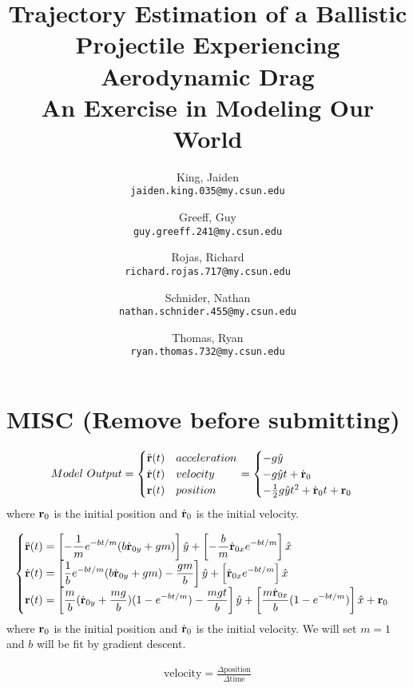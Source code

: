 \documentclass[12pt,english]{article}
\author{
	King, Jaiden\\
	\texttt{jaiden.king.035@my.csun.edu}
	\and
	Greeff, Guy\\
	\texttt{guy.greeff.241@my.csun.edu}
	\and
	Rojas, Richard\\
	\texttt{richard.rojas.717@my.csun.edu}
	\and
	Schnider, Nathan\\
	\texttt{nathan.schnider.455@my.csun.edu}
	\and
	Thomas, Ryan\\
	\texttt{ryan.thomas.732@my.csun.edu}
}
\title{Trajectory Estimation of a Ballistic Projectile Experiencing Aerodynamic Drag\\\large{An Exercise in Modeling Our World}}
\begin{document}
\maketitle

\tableofcontents










\section{MISC (Remove before submitting)}

\begin{align*}
Model\ Output =
\begin{cases} 
\ddot{\bf r}(t) & acceleration \\
\dot{\bf r}(t) & velocity \\
{\bf r}(t) & position
\end{cases}
= 
\begin{cases}
-g\hat{y} \\
-g\hat{y}t + \dot{\bf r}_0 \\
-\frac12g\hat{y}t^2 + \dot{\bf r}_0t + {\bf r}_0
\end{cases}
\end{align*}
where ${\bf r}_0$ is the initial position and $\dot{\bf r}_0$ is the initial velocity.

\newpage
\begin{align*}
\begin{cases} 
\displaystyle \ddot{\bf r}(t) = \left[-\frac{1}{m}e^{-bt/m}(b\dot{\bf r}_{0y}+gm)\right]\hat{y} + \left[-\frac{b}{m}\dot{\bf r}_{0x}e^{-bt/m}\right]\hat{x} 
\\
\displaystyle \dot{\bf r}(t) = \left[\frac{1}{b}e^{-bt/m}(b\dot{\bf r}_{0y}+gm)-\frac{gm}{b}\right]\hat{y} + \left[\dot{\bf r}_{0x}e^{-bt/m}\right]\hat{x} 
\\
\displaystyle {\bf r}(t) = \left[\frac{m}{b}(\dot{\bf r}_{0y}+\frac{mg}{b})(1-e^{-bt/m})-\frac{mgt}{b}\right]\hat{y} + \left[\frac{m\dot{\bf r}_{0x}}{b}(1-e^{-bt/m})\right]\hat{x} + {\bf r}_0
\end{cases}
\end{align*}
where ${\bf r}_0$ is the initial position and $\dot{\bf r}_0$ is the initial velocity. We will set $m=1$ and $b$ will be fit by gradient descent.

\begin{align*}
\text{velocity} = \frac{\Delta \text{position}}{\Delta \text{time}}
\end{align*}
\end{document}
